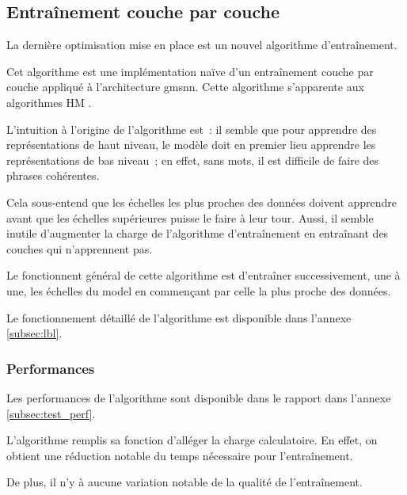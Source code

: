 \subsection{Entraînement couche par couche}\label{subsec:optilbl}
La dernière optimisation mise en place est un nouvel algorithme d'entraînement.

Cet algorithme est une implémentation naïve d'un entraînement couche par couche appliqué à l'architecture \gls{gmsnn}. Cette algorithme s'apparente aux algorithmes HM \autocite{hm}.

L'intuition à l'origine de l'algorithme est~:
il semble que pour apprendre des représentations de haut niveau, le modèle doit en premier lieu apprendre les représentations de bas niveau~;
en effet, sans mots, il est difficile de faire des phrases cohérentes.

Cela sous-entend que les échelles les plus proches des données doivent apprendre avant que les échelles supérieures puisse le faire à leur tour.
Aussi, il semble inutile d'augmenter la charge de l'algorithme d'entraînement en entraînant des couches qui n'apprennent pas.

Le fonctionnent général de cette algorithme est d'entraîner successivement, une à une, les échelles du \gls{model} en commençant par celle la plus proche des données.

Le fonctionnement détaillé de l'algorithme est disponible dans l'annexe \ref{subsec:lbl}.

\subsubsection{Performances}
Les performances de l'algorithme sont disponible dans le rapport dans l'annexe \ref{subsec:test_perf}.

L'algorithme remplis sa fonction d'alléger la charge calculatoire. En effet, on obtient une réduction notable du temps nécessaire pour l'entraînement.

De plus, il n'y à aucune variation notable de la qualité de l'entraînement.


